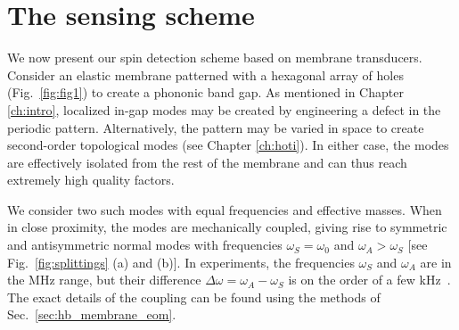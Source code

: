 
\section{The sensing scheme} \label{sec:spins_scheme}
We now present our spin detection scheme based on membrane transducers. Consider an elastic membrane patterned with a hexagonal array of holes (Fig.~\ref{fig:fig1}) to create a phononic band gap. As mentioned in Chapter \ref{ch:intro}, localized in-gap modes may be created by engineering a defect in the periodic pattern. Alternatively, the pattern may be varied in space to create second-order topological modes (see Chapter \ref{ch:hoti}). In either case, the modes are effectively isolated from the rest of the membrane and can thus reach extremely high quality factors.

We consider two such modes with equal frequencies and effective masses. When in close proximity, the modes are mechanically coupled, giving rise to symmetric and antisymmetric normal modes with frequencies $\omega_S = \omega_0$ and $\omega_A > \omega_S$ [see Fig.~\ref{fig:splittings} (a) and (b)]. In experiments, the frequencies $\omega_S$ and $\omega_A$ are in the MHz range, but their difference $\Delta \omega = \omega_A - \omega_S$ is on the order of a few kHz~\cite{Haelg_2021, Catalini_2020}. The exact details of the coupling can be found using the methods of Sec.~\ref{sec:hb_membrane_eom}.

